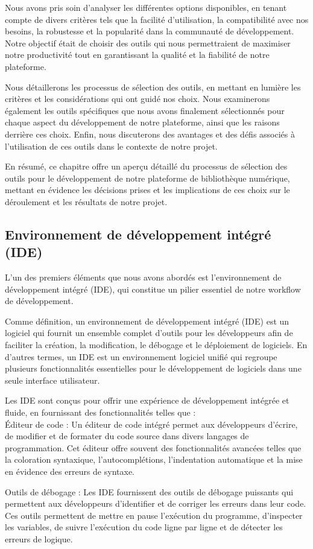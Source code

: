 Nous avons pris soin d'analyser les différentes options disponibles, en tenant compte de divers critères tels que la facilité d'utilisation, la compatibilité avec nos besoins, la robustesse et la popularité dans la communauté de développement. Notre objectif était de choisir des outils qui nous permettraient de maximiser notre productivité tout en garantissant la qualité et la fiabilité de notre plateforme.\par

Nous détaillerons les processus de sélection des outils, en mettant en lumière les critères et les considérations qui ont guidé nos choix. Nous examinerons également les outils spécifiques que nous avons finalement sélectionnés pour chaque aspect du développement de notre plateforme, ainsi que les raisons derrière ces choix. Enfin, nous discuterons des avantages et des défis associés à l'utilisation de ces outils dans le contexte de notre projet.\par

En résumé, ce chapitre offre un aperçu détaillé du processus de sélection des outils pour le développement de notre plateforme de bibliothèque numérique, mettant en évidence les décisions prises et les implications de ces choix sur le déroulement et les résultats de notre projet.

\subsection{Environnement de développement intégré (IDE)}
L'un des premiers éléments que nous avons abordés est l'environnement de développement intégré (IDE), qui constitue un pilier essentiel de notre workflow de développement.\par

	Comme définition, un environnement de développement intégré (IDE) est un logiciel qui fournit un ensemble complet d'outils pour les développeurs afin de faciliter la création, la modification, le débogage et le déploiement de logiciels. En d'autres termes, un IDE est un environnement logiciel unifié qui regroupe plusieurs fonctionnalités essentielles pour le développement de logiciels dans une seule interface utilisateur.\par 

Les IDE sont conçus pour offrir une expérience de développement intégrée et fluide, en fournissant des fonctionnalités telles que :\\

	Éditeur de code : Un éditeur de code intégré permet aux développeurs d'écrire, de modifier et de formater du code source dans divers langages de programmation. Cet éditeur offre souvent des fonctionnalités avancées telles que la coloration syntaxique, l'autocomplétions, l'indentation automatique et la mise en évidence des erreurs de syntaxe.
\par
	Outils de débogage : Les IDE fournissent des outils de débogage puissants qui permettent aux développeurs d'identifier et de corriger les erreurs dans leur code. Ces outils permettent de mettre en pause l'exécution du programme, d'inspecter les variables, de suivre l'exécution du code ligne par ligne et de détecter les erreurs de logique.\par

